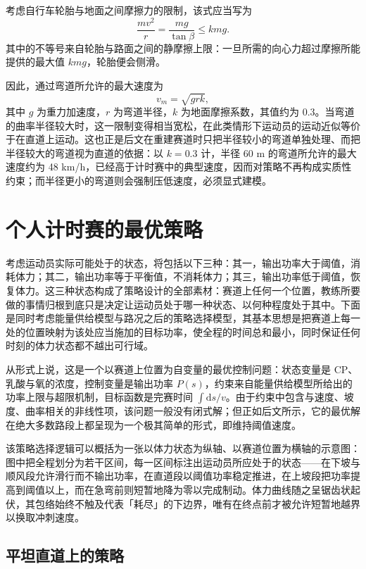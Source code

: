 \documentclass[11pt,a4paper]{ctexart}
\begin{document}
考虑自行车轮胎与地面之间摩擦力的限制，该式应当写为
\begin{equation}
\frac{mv^{2}}{r}=\frac{mg}{\tan\beta}\leqslant kmg.
\end{equation}
其中的不等号来自轮胎与路面之间的静摩擦上限：一旦所需的向心力超过摩擦所能提供的最大值 $kmg$，轮胎便会侧滑。

因此，通过弯道所允许的最大速度为
\begin{equation}
v_m=\sqrt{grk},
\end{equation}
其中 $g$ 为重力加速度，$r$ 为弯道半径，$k$ 为地面摩擦系数，其值约为 0.3。当弯道的曲率半径较大时，这一限制变得相当宽松，在此类情形下运动员的运动近似等价于在直道上运动。这也正是后文在重建赛道时只把半径较小的弯道单独处理、而把半径较大的弯道视为直道的依据：以 $k=0.3$ 计，半径 60 m 的弯道所允许的最大速度约为 48 km/h，已经高于计时赛中的典型速度，因而对策略不再构成实质性约束；而半径更小的弯道则会强制压低速度，必须显式建模。
\section{个人计时赛的最优策略}

考虑运动员实际可能处于的状态，将包括以下三种：其一，输出功率大于阈值，消耗体力；其二，输出功率等于平衡值，不消耗体力；其三，输出功率低于阈值，恢复体力。这三种状态构成了策略设计的全部素材：赛道上任何一个位置，教练所要做的事情归根到底只是决定让运动员处于哪一种状态、以何种程度处于其中。下面是同时考虑能量供给模型与路况之后的策略选择模型，其基本思想是把赛道上每一处的位置映射为该处应当施加的目标功率，使全程的时间总和最小，同时保证任何时刻的体力状态都不越出可行域。

从形式上说，这是一个以赛道上位置为自变量的最优控制问题：状态变量是 CP、乳酸与氧的浓度，控制变量是输出功率 $P(s)$，约束来自能量供给模型所给出的功率上限与超限机制，目标函数是完赛时间 $\int \mathrm{d}s/v$。由于约束中包含与速度、坡度、曲率相关的非线性项，该问题一般没有闭式解；但正如后文所示，它的最优解在绝大多数路段上都呈现为一个极其简单的形式，即维持阈值速度。

该策略选择逻辑可以概括为一张以体力状态为纵轴、以赛道位置为横轴的示意图：图中把全程划分为若干区间，每一区间标注出运动员所应处于的状态——在下坡与顺风段允许滑行而不输出功率，在直道段以阈值功率稳定推进，在上坡段把功率提高到阈值以上，而在急弯前则短暂地降为零以完成制动。体力曲线随之呈锯齿状起伏，其包络始终不触及代表「耗尽」的下边界，唯有在终点前才被允许短暂地越界以换取冲刺速度。

\subsection{平坦直道上的策略}
\end{document}
